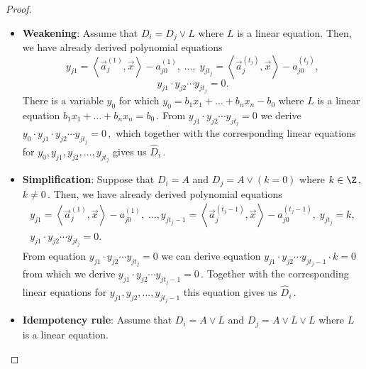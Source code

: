 \documentclass{toc}
\begin{document}
\begin{proof}
\begin{itemize}
 Then there is an equation $y_{i} = L_i$ from the set  $\{y_1 = L_1, y_2 = L_2, \ldots, y_t = L_t\}$ for which %
    $$
    L_{i} = \alpha \left(\left\langle \vec a_j^{(1)}, \vec x \right \rangle - a_{j 0}^{(1)}\right) + \beta \left(\left\langle \vec a_k^{(1)}, \vec x \right \rangle - a_{k 0}^{(1)}\right).
    $$
    Then we derive $y_{i} = \alpha y_{j 1} + \beta y_{k 1}$ and %
$y_{i} \cdot y_{j 2} \cdots y_{j t_j} \cdot y_{k 2} \cdots y_{k t_k} = 0\,,$ %
 which together with the corresponding linear equations for  $y_{i}, y_{j 2}, \ldots, y_{j t_j}, y_{k 2}, \ldots, y_{k t_k}$ give %
$\widehat{D}_i\,.$ %
    \item \textbf{Weakening}: Assume that $D_i = D_j \vee L$ where $L$ is a linear equation. Then, we have already derived polynomial equations 
    $$
    y_{j 1} = \left\langle \vec a_j^{(1)}, \vec x \right \rangle - a_{j 0}^{(1)}, \; \ldots, \; y_{j t_j} = \left\langle \vec a_j^{(t_j)}, \vec x \right \rangle - a_{j 0}^{(t_j)},
    $$
    $$
    y_{j 1} \cdot y_{j 2} \cdots y_{j t_j} = 0.
    $$
    There is a variable $y_0$ for which $y_0 = b_{1}x_1 + \ldots + b_n x_n - b_0$ where $L$ is a linear equation %
$b_{1}x_1 + \ldots + b_n x_n = b_0\,.$ %
 From $y_{j 1} \cdot y_{j 2} \cdots y_{j t_j} = 0$ we derive %
$y_0 \cdot y_{j 1} \cdot y_{j 2} \cdots y_{j t_j} = 0\,,$ %
 which together with the corresponding linear equations for  $y_{0}, y_{j 1}, y_{j 2}, \ldots, y_{j t_j}$ gives us %
$\widehat{D}_i\,.$ %
%
    \item \textbf{Simplification}: Suppose that $D_i = A$ and $D_j = A \vee (k = 0)$ where %
$k \in \Z\,,$ %
$k \neq 0\,.$ %
 Then, we have already derived polynomial equations
    \begin{align*}
    y_{j 1} = \left\langle \vec a_j^{(1)}, \vec x \right \rangle - a_{j 0}^{(1)}, \; \ldots, y_{j t_j - 1} =\left\langle \vec a_j^{(t_j - 1)}, \vec x \right \rangle - a_{j 0}^{(t_j - 1)}, \; y_{j t_j} = k, \\ %
	y_{j 1} \cdot y_{j 2} \cdots y_{j t_j} = 0.
    \end{align*}
    From equation $y_{j 1} \cdot y_{j 2} \cdots y_{j t_j} = 0$ we can derive equation $y_{j 1} \cdot y_{j 2} \cdots y_{j t_j - 1} \cdot k = 0$ from which we derive %
$y_{j 1} \cdot y_{j 2} \cdots y_{j t_j - 1} = 0\,.$ %
 Together with the corresponding linear equations for  $y_{j 1}, y_{j 2}, \ldots, y_{j t_j - 1}$ this equation gives us %
$\widehat{D}_i\,.$ %
    \item \textbf{Idempotency rule}: Assume that $D_i = A \vee L$ and $D_j = A \vee L \vee L$ where $L$ is a linear equation. %

\end{itemize}
\end{proof}
\end{document}
